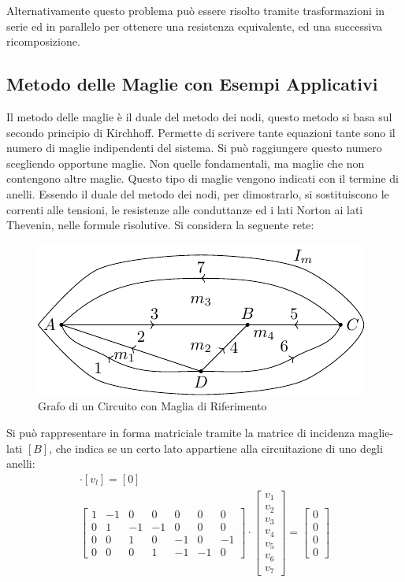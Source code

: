\documentclass{article}
\numberwithin{equation}{subsection}
\begin{document}
Alternativamente questo problema può essere risolto tramite trasformazioni in serie ed in parallelo per ottenere una resistenza equivalente, ed una successiva ricomposizione. 

\subsection{Metodo delle Maglie con Esempi Applicativi}

Il metodo delle maglie è il duale del metodo dei nodi, questo metodo si basa sul secondo principio di Kirchhoff. Permette di scrivere tante equazioni tante sono il numero di 
maglie indipendenti del sistema. Si può raggiungere questo numero scegliendo opportune maglie. Non quelle fondamentali, ma maglie che non contengono altre maglie. Questo 
tipo di maglie vengono indicati con il termine di anelli. Essendo il duale del metodo dei nodi, per dimostrarlo, si sostituiscono le correnti alle tensioni, le resistenze alle 
conduttanze ed i lati Norton ai lati Thevenin, nelle formule risolutive. 
Si considera la seguente rete:
\begin{figure}[H]%
    \centering
    \includegraphics{maglia-riferimento.pdf}
    \caption{Grafo di un Circuito con Maglia di Riferimento}
    \label{fig:maglia-riferimento}
\end{figure}

Si può rappresentare in forma matriciale tramite la matrice di incidenza maglie-lati $[B]$, che  indica se un certo lato appartiene alla circuitazione di uno degli anelli:
\begin{gather*}
    [B]\cdot[v_l]=[0]\\
    \begin{bmatrix}
        1&-1&0&0&0&0&0\\
        0&1&-1&-1&0&0&0\\
        0&0&1&0&-1&0&-1\\
        0&0&0&1&-1&-1&0
    \end{bmatrix}\cdot\begin{bmatrix}
        v_1\\v_2\\v_3\\v_4\\v_5\\v_6\\v_7
    \end{bmatrix}=\begin{bmatrix}
        0\\0\\0\\0
    \end{bmatrix}
\end{gather*}
\end{document}
